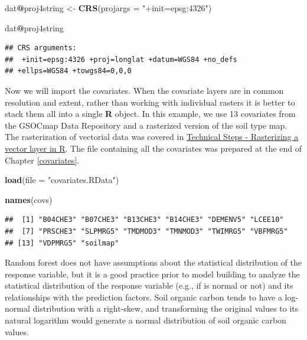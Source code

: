 \documentclass[10pt,b5paper,]{book}
\newenvironment{Shaded}{\begin{snugshade}}{\end{snugshade}}
\newcommand{\DataTypeTok}[1]{\textcolor[rgb]{0.13,0.29,0.53}{#1}}
\newcommand{\KeywordTok}[1]{\textcolor[rgb]{0.13,0.29,0.53}{\textbf{#1}}}
\newcommand{\NormalTok}[1]{#1}
\newcommand{\OperatorTok}[1]{\textcolor[rgb]{0.81,0.36,0.00}{\textbf{#1}}}
\newcommand{\StringTok}[1]{\textcolor[rgb]{0.31,0.60,0.02}{#1}}
\theoremstyle{definition}
\theoremstyle{definition}
\theoremstyle{definition}
\theoremstyle{remark}
\begin{document}
\begin{Shaded}
\begin{Highlighting}[]
\NormalTok{dat}\OperatorTok{@}\NormalTok{proj4string <-}\StringTok{ }\KeywordTok{CRS}\NormalTok{(}\DataTypeTok{projargs =} \StringTok{"+init=epsg:4326"}\NormalTok{)}

\NormalTok{dat}\OperatorTok{@}\NormalTok{proj4string}
\end{Highlighting}
\end{Shaded}

\begin{verbatim}
## CRS arguments:
##  +init=epsg:4326 +proj=longlat +datum=WGS84 +no_defs
## +ellps=WGS84 +towgs84=0,0,0
\end{verbatim}

Now we will import the covariates. When the covariate layers are in
common resolution and extent, rather than working with individual
rasters it is better to stack them all into a single \textbf{R} object.
In this example, we use 13 covariates from the GSOCmap Data Repository
and a rasterized version of the soil type map. The rasterization of
vectorial data was covered in
\protect\hyperlink{technical-steps---rasterizing-a-vector-layer-in-r}{Technical
Steps - Rasterizing a vector layer in R}. The file containing all the
covariates was prepared at the end of Chapter \ref{covariates}.

\begin{Shaded}
\begin{Highlighting}[]
\KeywordTok{load}\NormalTok{(}\DataTypeTok{file =} \StringTok{"covariates.RData"}\NormalTok{)}

\KeywordTok{names}\NormalTok{(covs)}
\end{Highlighting}
\end{Shaded}

\begin{verbatim}
##  [1] "B04CHE3" "B07CHE3" "B13CHE3" "B14CHE3" "DEMENV5" "LCEE10" 
##  [7] "PRSCHE3" "SLPMRG5" "TMDMOD3" "TMNMOD3" "TWIMRG5" "VBFMRG5"
## [13] "VDPMRG5" "soilmap"
\end{verbatim}

Random forest does not have assumptions about the statistical
distribution of the response variable, but it is a good practice prior
to model building to analyze the statistical distribution of the
response variable (e.g., if is normal or not) and its relationships with
the prediction factors. Soil organic carbon tends to have a log-normal
distribution with a right-skew, and transforming the original values to
its natural logarithm would generate a normal distribution of soil
organic carbon values.
\end{document}
